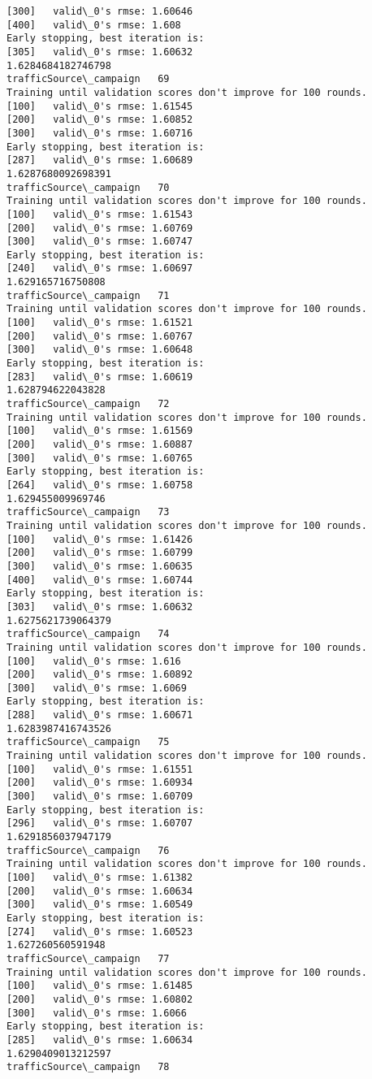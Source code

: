 \documentclass[11pt]{article}
\begin{document}
\begin{Verbatim}[commandchars=\\\{\}]
[300]	valid\_0's rmse: 1.60646
[400]	valid\_0's rmse: 1.608
Early stopping, best iteration is:
[305]	valid\_0's rmse: 1.60632
1.6284684182746798
trafficSource\_campaign   69
Training until validation scores don't improve for 100 rounds.
[100]	valid\_0's rmse: 1.61545
[200]	valid\_0's rmse: 1.60852
[300]	valid\_0's rmse: 1.60716
Early stopping, best iteration is:
[287]	valid\_0's rmse: 1.60689
1.6287680092698391
trafficSource\_campaign   70
Training until validation scores don't improve for 100 rounds.
[100]	valid\_0's rmse: 1.61543
[200]	valid\_0's rmse: 1.60769
[300]	valid\_0's rmse: 1.60747
Early stopping, best iteration is:
[240]	valid\_0's rmse: 1.60697
1.629165716750808
trafficSource\_campaign   71
Training until validation scores don't improve for 100 rounds.
[100]	valid\_0's rmse: 1.61521
[200]	valid\_0's rmse: 1.60767
[300]	valid\_0's rmse: 1.60648
Early stopping, best iteration is:
[283]	valid\_0's rmse: 1.60619
1.628794622043828
trafficSource\_campaign   72
Training until validation scores don't improve for 100 rounds.
[100]	valid\_0's rmse: 1.61569
[200]	valid\_0's rmse: 1.60887
[300]	valid\_0's rmse: 1.60765
Early stopping, best iteration is:
[264]	valid\_0's rmse: 1.60758
1.629455009969746
trafficSource\_campaign   73
Training until validation scores don't improve for 100 rounds.
[100]	valid\_0's rmse: 1.61426
[200]	valid\_0's rmse: 1.60799
[300]	valid\_0's rmse: 1.60635
[400]	valid\_0's rmse: 1.60744
Early stopping, best iteration is:
[303]	valid\_0's rmse: 1.60632
1.6275621739064379
trafficSource\_campaign   74
Training until validation scores don't improve for 100 rounds.
[100]	valid\_0's rmse: 1.616
[200]	valid\_0's rmse: 1.60892
[300]	valid\_0's rmse: 1.6069
Early stopping, best iteration is:
[288]	valid\_0's rmse: 1.60671
1.6283987416743526
trafficSource\_campaign   75
Training until validation scores don't improve for 100 rounds.
[100]	valid\_0's rmse: 1.61551
[200]	valid\_0's rmse: 1.60934
[300]	valid\_0's rmse: 1.60709
Early stopping, best iteration is:
[296]	valid\_0's rmse: 1.60707
1.6291856037947179
trafficSource\_campaign   76
Training until validation scores don't improve for 100 rounds.
[100]	valid\_0's rmse: 1.61382
[200]	valid\_0's rmse: 1.60634
[300]	valid\_0's rmse: 1.60549
Early stopping, best iteration is:
[274]	valid\_0's rmse: 1.60523
1.627260560591948
trafficSource\_campaign   77
Training until validation scores don't improve for 100 rounds.
[100]	valid\_0's rmse: 1.61485
[200]	valid\_0's rmse: 1.60802
[300]	valid\_0's rmse: 1.6066
Early stopping, best iteration is:
[285]	valid\_0's rmse: 1.60634
1.6290409013212597
trafficSource\_campaign   78

\end{Verbatim}
\end{document}
